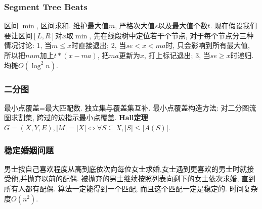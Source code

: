 \subsubsection{Segment Tree Beats}
        区间 $\min$, 区间求和. 维护最大值$m$, 严格次大值$s$以及最大值个数$t$. 现在假设我们要让区间$[L,R]$对$x$取$\min$, 先在线段树中定位若干个节点, 对于每个节点分三种情况讨论: 1, 当$m\leq x$时直接退出; 2, 当$se<x<ma$时, 只会影响到所有最大值, 所以把$num$加上$t*(x-ma)$, 把$ma$更新为$x$, 打上标记退出; 3, 当$se\geq x$时递归. 均摊$O(\log^2n)$. 
\subsubsection{二分图}
        最小点覆盖=最大匹配数. 独立集与覆盖集互补. 最小点覆盖构造方法: 对二分图流图求割集, 跨过的边指示最小点覆盖.
        \textbf{Hall定理}$G=(X,Y,E), |M|=|X| \Leftrightarrow \forall S \subseteq X, |S| \leq |A(S)|$. 

\subsubsection{稳定婚姻问题}
         男士按自己喜欢程度从高到底依次向每位女士求婚,女士遇到更喜欢的男士时就接受他,并抛弃以前的配偶. 被抛弃的男士继续按照列表向剩下的女士依次求婚, 直到所有人都有配偶. 算法一定能得到一个匹配, 而且这个匹配一定是稳定的. 时间复杂度$O(n^2)$. 

